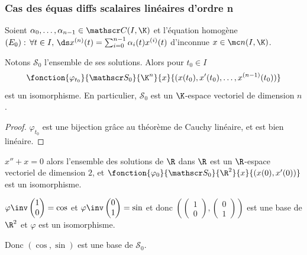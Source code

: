 \subsubsection{Cas des équas diffs scalaires linéaires d'ordre n}

\begin{proposition}{}{}
    Soient $\alpha_0, \dots, \alpha_{n - 1} \in \mathscr C(I, \K)$ et l'équation homogène
    $(E_0) : \, \forall t \in I, \, \ds x^{(n)}(t) = \sum_{i = 0}^{n - 1} \alpha_i(t) x^{(i)}(t)$
    d'inconnue $x \in \mc n (I, \K)$.

    
    \lvspace \avspace Notons $\mathscr S_0$ l'ensemble de ses solutions. Alors pour $t_0 \in I$ 
    $$\fonction{\varphi_{t_0}}{\mathscr S_0}{\K^n}{x}{(x(t_0), x'(t_0), \dots, x^{(n - 1)}(t_0))}$$ est un isomorphisme. 
    En particulier, $\mathscr S_0$ est un $\K$-espace vectoriel de dimension $n$.
\end{proposition}

\begin{proof}
    $\varphi_{t_0}$ est une bijection grâce au théorème de Cauchy linéaire, et est 
    bien linéaire. 
\end{proof}

\begin{exemple}
    $x'' + x = 0$ alors l'ensemble des solutions de $\R$ dans $\R$ est un 
    $\R$-espace vectoriel de dimension $2$, et 
    $\fonction{\varphi_0}{\mathscr S_0}{\R^2}{x}{(x(0), x'(0))}$ est un isomorphisme.

    $\varphi\inv \begin{pmatrix}
    1 \\ 0
    \end{pmatrix} = \cos$ et $\varphi\inv \begin{pmatrix}
    0 \\ 1
    \end{pmatrix} = \sin$ et donc $\left( \begin{pmatrix}
        1 \\ 0
    \end{pmatrix}, 
    \begin{pmatrix}
        0 \\ 1
    \end{pmatrix} \right)$ est une base de $\R^2$ et $\varphi$ est un isomorphisme. 

    Donc $(\cos, \sin)$ est une base de $\mathscr S_0$. 
\end{exemple}

